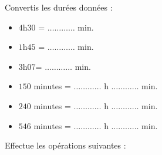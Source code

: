 \begin{pageAuto} 


\ExoAuto
 

Convertis les durées données :\vspace{0.2cm}

\begin{minipage}{0.50\linewidth}
 \begin{itemize}
 \item $4$h$30$ =  $\ldots \ldots\ldots\ldots $ min.  \vspace{0.2cm}
 \item $1$h$45$ =  $\ldots \ldots\ldots\ldots $ min. \vspace{0.2cm}
 \item $3$h$07$=  $\ldots \ldots\ldots\ldots $ min. \vspace{0.2cm}
 \end{itemize}
\end{minipage}
\begin{minipage}{0.50\linewidth}
 \begin{itemize}
 \item $150$ minutes  =  $\ldots \ldots \ldots \ldots $ h $\ldots \ldots \ldots \ldots $ min. \vspace{0.2cm}
 \item $240$ minutes = $\ldots \ldots \ldots \ldots $ h $\ldots \ldots \ldots \ldots $ min. \vspace{0.2cm}
 \item $546$ minutes = $\ldots \ldots \ldots \ldots $ h $\ldots \ldots \ldots \ldots $ min. \vspace{0.2cm}
 \end{itemize}
\end{minipage}



\ExoAuto
 
 
 Effectue  les opérations suivantes :
 

\end{pageAuto}
